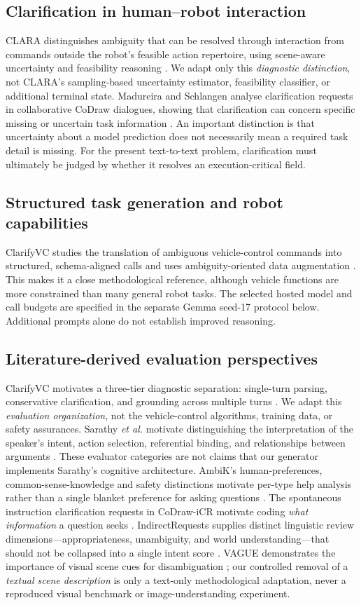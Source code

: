 \documentclass[10pt,conference]{IEEEtran}
\begin{document}
\subsection{Clarification in human--robot interaction}
CLARA distinguishes ambiguity that can be resolved through interaction from commands outside the robot's feasible action repertoire, using scene-aware uncertainty and feasibility reasoning \cite{clara}. We adapt only this \emph{diagnostic distinction}, not CLARA's sampling-based uncertainty estimator, feasibility classifier, or additional terminal state. Madureira and Schlangen analyse clarification requests in collaborative CoDraw dialogues, showing that clarification can concern specific missing or uncertain task information \cite{codraw}. An important distinction is that uncertainty about a model prediction does not necessarily mean a required task detail is missing. For the present text-to-text problem, clarification must ultimately be judged by whether it resolves an execution-critical field.

\subsection{Structured task generation and robot capabilities}
ClarifyVC studies the translation of ambiguous vehicle-control commands into structured, schema-aligned calls and uses ambiguity-oriented data augmentation \cite{clarifyvc}. This makes it a close methodological reference, although vehicle functions are more constrained than many general robot tasks. The selected hosted model and call budgets are specified in the separate Gemma seed-17 protocol below. Additional prompts alone do not establish improved reasoning.

\subsection{Literature-derived evaluation perspectives}
ClarifyVC motivates a three-tier diagnostic separation: single-turn parsing, conservative clarification, and grounding across multiple turns \cite{clarifyvc}. We adapt this \emph{evaluation organization}, not the vehicle-control algorithms, training data, or safety assurances. Sarathy \emph{et al.} motivate distinguishing the interpretation of the speaker's intent, action selection, referential binding, and relationships between arguments \cite{sarathy}. These evaluator categories are not claims that our generator implements Sarathy's cognitive architecture. AmbiK's human-preferences, common-sense-knowledge and safety distinctions motivate per-type help analysis rather than a single blanket preference for asking questions \cite{ambik}. The spontaneous instruction clarification requests in CoDraw-iCR motivate coding \emph{what information} a question seeks \cite{codraw}. IndirectRequests supplies distinct linguistic review dimensions---appropriateness, unambiguity, and world understanding---that should not be collapsed into a single intent score \cite{mannekote}. VAGUE demonstrates the importance of visual scene cues for disambiguation \cite{vague}; our controlled removal of a \emph{textual scene description} is only a text-only methodological adaptation, never a reproduced visual benchmark or image-understanding experiment.
\end{document}
